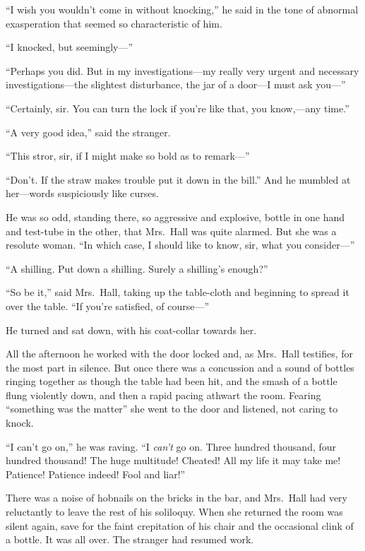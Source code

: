 “I wish you wouldn’t come in without knocking,” he said in the tone of abnormal exasperation that seemed so characteristic of him.

“I knocked, but seemingly—”

“Perhaps you did. But in my investigations—my really very urgent and necessary investigations—the slightest disturbance, the jar of a door—I must ask you—”

“Certainly, sir. You can turn the lock if you’re like that, you know,—any time.”

“A very good idea,” said the stranger.

“This stror, sir, if I might make so bold as to remark—”

“Don’t. If the straw makes trouble put it down in the bill.” And he mumbled at her—words suspiciously like curses.

He was so odd, standing there, so aggressive and explosive, bottle in one hand and test-tube in the other, that Mrs.\ Hall was quite alarmed. But she was a resolute woman. “In which case, I should like to know, sir, what you consider—”

{“A shilling. Put down a shilling. Surely a shilling’s enough?”}

“So be it,” said Mrs.\ Hall, taking up the table-cloth and beginning to spread it over the table. “If you’re satisfied, of course—”

He turned and sat down, with his coat-collar towards her.

All the afternoon he worked with the door locked and, as Mrs.\ Hall testifies, for the most part in silence. But once there was a concussion and a sound of bottles ringing together as though the table had been hit, and the smash of a bottle flung violently down, and then a rapid pacing athwart the room. Fearing “something was the matter” she went to the door and listened, not caring to knock.

“I can’t go on,” he was raving. “I \emph{can’t} go on. Three hundred thousand, four hundred thousand! The huge multitude! Cheated! All my life it may take me! Patience! Patience indeed! Fool and liar!”

There was a noise of hobnails on the bricks in the bar, and Mrs.\ Hall had very reluctantly to leave the rest of his soliloquy. When she returned the room was silent again, save for the faint crepitation of his chair and the occasional clink of a bottle. It was all over. The stranger had resumed work.

